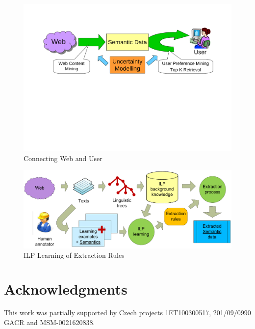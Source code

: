 \documentclass{www2009-submission}
\begin{document}
\begin{figure}
\centering
\includegraphics[width=\hsize]{img/Web2User}
\caption{Connecting Web and User}
\label{img:Web2User}
\end{figure}

\begin{figure}
\centering
\includegraphics[width=\hsize]{img/DedVoj_ILP}
\caption{ILP Learning of Extraction Rules}
\label{img:DedVoj_ILP}
\end{figure}


\section{Acknowledgments}
This work was partially supported by Czech projects 1ET100300517, 201/09/0990 GACR and MSM-0021620838.

%



\balancecolumns %
\end{document}
